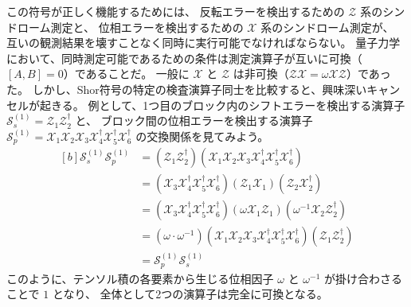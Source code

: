 \documentclass[../master.tex]{subfiles}
\begin{document}
この符号が正しく機能するためには、
反転エラーを検出するための $\mathcal{Z}$ 系のシンドローム測定と、
位相エラーを検出するための $\mathcal{X}$ 系のシンドローム測定が、
互いの観測結果を壊すことなく同時に実行可能でなければならない。
量子力学において、同時測定可能であるための条件は測定演算子が互いに可換（$[A, B] = 0$）であることだ。
一般に $\mathcal{X}$ と $\mathcal{Z}$ は非可換（$\mathcal{Z} \mathcal{X} = \omega \mathcal{X} \mathcal{Z}$）であった。
しかし、Shor符号の特定の検査演算子同士を比較すると、興味深いキャンセルが起きる。
例として、1つ目のブロック内のシフトエラーを検出する演算子 $\mathcal{S}_s^{(1)} = \mathcal{Z}_1 \mathcal{Z}_2^\dagger$ と、
ブロック間の位相エラーを検出する演算子
$\mathcal{S}_p^{(1)} = \mathcal{X}_1 \mathcal{X}_2 \mathcal{X}_3 \mathcal{X}_4^\dagger \mathcal{X}_5^\dagger \mathcal{X}_6^\dagger$
 の交換関係を見てみよう。
 \begin{equation}\begin{aligned}[b]
    \mathcal{S}_s^{(1)} \mathcal{S}_p^{(1)} &= (\mathcal{Z}_1 \mathcal{Z}_2^\dagger)( \mathcal{X}_1 \mathcal{X}_2 \mathcal{X}_3 \mathcal{X}_4^\dagger \mathcal{X}_5^\dagger \mathcal{X}_6^\dagger)\\
    &= (\mathcal{X}_3 \mathcal{X}_4^\dagger \mathcal{X}_5^\dagger \mathcal{X}_6^\dagger)(\mathcal{Z}_1 \mathcal{X}_1) (\mathcal{Z}_2 \mathcal{X}_2^\dagger)\\
    &= (\mathcal{X}_3 \mathcal{X}_4^\dagger \mathcal{X}_5^\dagger \mathcal{X}_6^\dagger)(\omega \mathcal{X}_1 \mathcal{Z}_1) (\omega^{-1} \mathcal{X}_2 \mathcal{Z}_2^\dagger)  \\
    &= (\omega \cdot \omega^{-1}) ( \mathcal{X}_1 \mathcal{X}_2 \mathcal{X}_3 \mathcal{X}_4^\dagger \mathcal{X}_5^\dagger \mathcal{X}_6^\dagger) (\mathcal{Z}_1 \mathcal{Z}_2^\dagger)\\
    &= \mathcal{S}_p^{(1)} \mathcal{S}_s^{(1)}
\end{aligned}\end{equation}
このように、テンソル積の各要素から生じる位相因子 $\omega$ と $\omega^{-1}$ が掛け合わさることで $1$ となり、
全体として2つの演算子は完全に可換となる。
\end{document}

